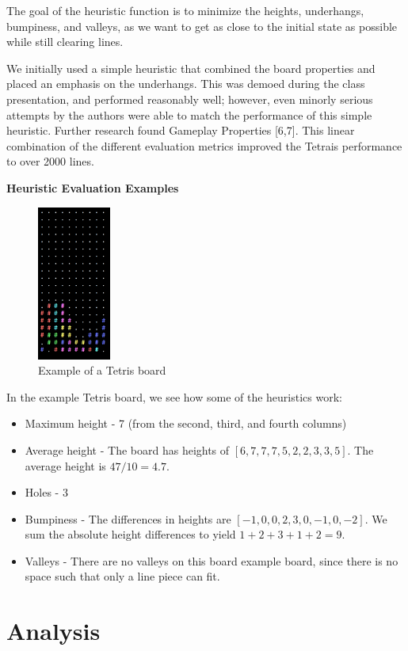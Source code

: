\documentclass[12pt]{article}
\begin{document}
The goal of the heuristic function is to minimize the heights, underhangs, bumpiness, and valleys, as we want to get as close to the initial state as possible while still clearing lines.

We initially used a simple heuristic that combined the board properties and placed an emphasis on the underhangs. This was demoed during the class presentation, and performed reasonably well; however, even minorly serious attempts by the authors were able to match the performance of this simple heuristic. Further research found Gameplay Properties [6,7]. This linear combination of the different evaluation metrics improved the Tetrais performance to over 2000 lines.

\textbf{Heuristic Evaluation Examples}

\begin{figure}[h!]
    \centering
\includegraphics[height=2.0in]{bumpiness.png}
\caption{Example of a Tetris board}
\end{figure}

In the example Tetris board, we see how some of the heuristics work:
\begin{itemize}
    \item Maximum height - 7 (from the second, third, and fourth columns)
    \item Average height - The board has heights of $[6, 7, 7, 7, 5, 2, 2, 3, 3, 5]$. The average height is $47 / 10 = 4.7$. 
    \item Holes - 3
    \item Bumpiness -  The differences in heights are $[-1, 0, 0, 2, 3, 0, -1, 0, -2]$. We sum the absolute height differences to yield $1 + 2 + 3 + 1 + 2 = 9$.
    \item Valleys - There are no valleys on this board example board, since there is no space such that only a line piece can fit.
\end{itemize}

\section{Analysis}
\end{document}
